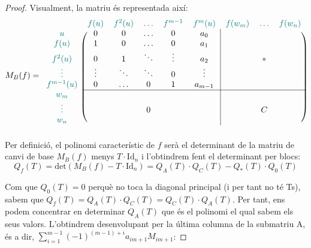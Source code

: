 \begin{proof}
Visualment, la matriu és representada així: 
\[ M_B(f)=
\begin{blockarray}{ccccccccc}
 & \textcolor{teal}{f(u)} & \textcolor{teal}{f^2(u)}& \textcolor{teal}{\dots}  & \textcolor{teal}{f^{m-1}} & \textcolor{teal}{f^m(u)} & \textcolor{teal}{f(w_m)} & \textcolor{teal}{\dots} & \textcolor{teal}{f(w_n)} \\
\begin{block}{c(ccccc|ccc)}
  \textcolor{teal}{u} &0&0&\dots &0& a_0 & & & \\
  \textcolor{teal}{f(u)} & 1 & 0&\dots &0 & a_1 & & & \\
  \textcolor{teal}{f^2(u)} &0& 1 & \ddots& \vdots& a_2 & & * & \\
  \textcolor{teal}{\vdots} & \vdots& \ddots & \ddots & 0& \vdots & & & \\
  \textcolor{teal}{f^{m-1}(u)} & 0& \dots& 0 & 1 & a_{m-1} & & & \\ \cline{2-9}
  \textcolor{teal}{w_m} & & & & & & & & \\
  \textcolor{teal}{\vdots} & & & 0 & & & & C & \\
  \textcolor{teal}{w_n} & & & & & & & & \\
\end{block}
\end{blockarray}
 \]
Per definició, el polinomi característic de $f$ serà el determinant de la matriu de canvi de base $M_B(f)$ menys $T\cdot\text{Id}_n$ i l'obtindrem fent el determinant per blocs:
\[ Q_f(T) = \text{det} (M_B(f) - T \cdot \text{Id}_n) = Q_A(T)\cdot Q_C(T) - Q_*(T)\cdot Q_0(T)\]

Com que $Q_0(T) = 0$ perquè no toca la diagonal principal (i per tant no té Ts), sabem que $Q_f(T) = Q_A(T)\cdot Q_C(T) = Q_C(T)\cdot Q_A(T)$. Per tant, ens podem concentrar en determinar $Q_A(T)$ que és el polinomi el qual sabem els seus valors. L'obtindrem desenvolupant per la última columna de la submatriu A, és a dir, $\sum\limits_{i=1}^{m-1}(-1)^{(m-1) + i}a_{im+1}M_{im+1}$:


\end{proof}
